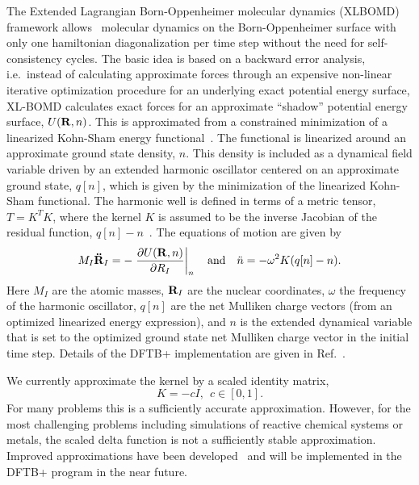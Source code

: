 \documentclass[reprint,onecolumn,superscriptaddress]{revtex4-1}
\newcommand{\dftbp}{DFTB+}
\begin{document}
The Extended Lagrangian Born-Oppenheimer molecular dynamics (XLBOMD) framework
allows~\cite{ANiklasson08, ANiklasson17} molecular dynamics on the
Born-Oppenheimer surface with only one hamiltonian diagonalization per time step without the
need for self-consistency cycles.  The basic idea is based on a backward error
analysis, i.e.\ instead of calculating approximate forces through an expensive
non-linear iterative optimization procedure for an underlying exact potential
energy surface, XL-BOMD calculates exact forces for an approximate ``shadow'' potential energy surface, $U({\bf R},n)$. This is approximated from a
constrained minimization of a linearized Kohn-Sham energy functional~\cite{ANiklasson14,ANiklasson17}. The functional is linearized around an
approximate ground state density, $n$. This density is included as a dynamical
field variable driven by an extended harmonic oscillator centered on an approximate ground state, $q[n]$, which is given by the minimization of the linearized Kohn-Sham functional. The harmonic well is
defined in terms of a metric tensor, $T = K^T K$, where the kernel $K$ is
assumed to be the inverse Jacobian of the residual function, $q[n] - n$~\cite{ANiklasson17}.  The equations of motion are given by
\begin{equation}
  M_I{{\bf \ddot R}}_I = -\left. \frac{\partial U({\bf R},n)}{\partial
    R_I}\right \vert_n \quad \text{and} \quad {\ddot n} = -\omega^2 K(q[n] - n).
\end{equation}
Here $M_I$ are the atomic masses, ${\bf R}_I$ are the nuclear coordinates, $\omega$ the frequency of the harmonic oscillator, $q[n]$ are the net Mulliken charge vectors (from an optimized linearized energy expression), and $n$ is the extended dynamical
variable that is set to the optimized ground state net Mulliken charge vector in
the initial time step. Details of the \dftbp{} implementation are given in
Ref.~\cite{BAradi15}.

We currently approximate the kernel by a scaled
identity matrix,
\begin{equation}
  K = -cI, ~~ c\in [0,1].
\end{equation}
For many problems this is a sufficiently accurate approximation. However, for
the most challenging problems including simulations of reactive chemical systems
or metals, the scaled delta function is not a sufficiently stable
approximation. Improved approximations have been developed~\cite{ANiklasson17}
and will be implemented in the \dftbp{} program in the near future.
\end{document}
